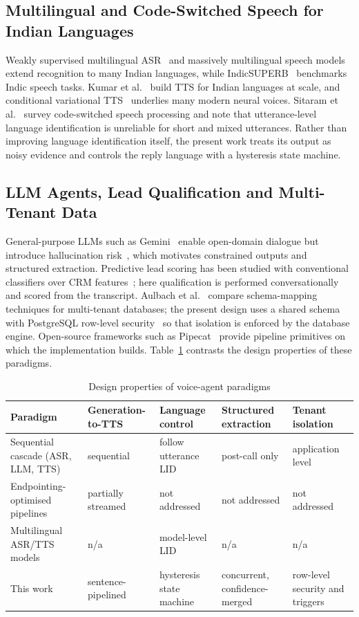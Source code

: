 \documentclass[conference]{IEEEtran}
\begin{document}
\subsection{Multilingual and Code-Switched Speech for Indian Languages}
Weakly supervised multilingual ASR~\cite{radford2023} and massively multilingual speech models~\cite{pratap2024} extend recognition to many Indian languages, while IndicSUPERB~\cite{javed2023} benchmarks Indic speech tasks. Kumar et al.~\cite{kumar2023} build TTS for Indian languages at scale, and conditional variational TTS~\cite{kim2021} underlies many modern neural voices. Sitaram et al.~\cite{sitaram2019} survey code-switched speech processing and note that utterance-level language identification is unreliable for short and mixed utterances. Rather than improving language identification itself, the present work treats its output as noisy evidence and controls the reply language with a hysteresis state machine.

\subsection{LLM Agents, Lead Qualification and Multi-Tenant Data}
General-purpose LLMs such as Gemini~\cite{gemini2023} enable open-domain dialogue but introduce hallucination risk~\cite{ji2023}, which motivates constrained outputs and structured extraction. Predictive lead scoring has been studied with conventional classifiers over CRM features~\cite{nygard2020}; here qualification is performed conversationally and scored from the transcript. Aulbach et al.~\cite{aulbach2008} compare schema-mapping techniques for multi-tenant databases; the present design uses a shared schema with PostgreSQL row-level security~\cite{pgrls} so that isolation is enforced by the database engine. Open-source frameworks such as Pipecat~\cite{pipecat} provide pipeline primitives on which the implementation builds. Table~\ref{tab:paradigms} contrasts the design properties of these paradigms.

\begin{table}[htbp]
\caption{Design properties of voice-agent paradigms}
\label{tab:paradigms}
\centering
\footnotesize
\begin{tabular}{@{}p{4.2cm}p{2.6cm}p{3.0cm}p{3.0cm}p{3.2cm}@{}}
\toprule
Paradigm & Generation-to-TTS & Language control & Structured extraction & Tenant isolation \\
\midrule
Sequential cascade (ASR, LLM, TTS) & sequential & follow utterance LID & post-call only & application level \\
Endpointing-optimised pipelines~\cite{skantze2021,shannon2017} & partially streamed & not addressed & not addressed & not addressed \\
Multilingual ASR/TTS models~\cite{radford2023,pratap2024,kumar2023} & n/a & model-level LID & n/a & n/a \\
This work & sentence-pipelined & hysteresis state machine & concurrent, confidence-merged & row-level security and triggers \\
\bottomrule
\end{tabular}
\end{table}
\end{document}
